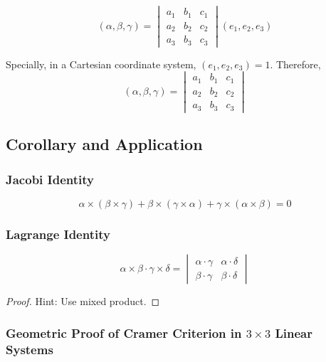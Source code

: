 \documentclass[onecolumn]{ctexart}
\begin{document}
\begin{equation}
  (\alpha, \beta, \gamma) = 
  \begin{vmatrix}
    a_1 & b_1 & c_1 \\
    a_2 & b_2 & c_2 \\
    a_3 & b_3 & c_3
  \end{vmatrix}
  (e_1, e_2, e_3)
\end{equation}

Specially, in a Cartesian coordinate system, $(e_1, e_2, e_3) = 1$. Therefore,
\begin{equation}
  (\alpha, \beta, \gamma) = 
  \begin{vmatrix}
    a_1 & b_1 & c_1 \\
    a_2 & b_2 & c_2 \\
    a_3 & b_3 & c_3
  \end{vmatrix}
\end{equation}

\subsection{Corollary and Application}

\subsubsection{Jacobi Identity}

\begin{equation}
  \alpha \times (\beta \times \gamma) + \beta \times (\gamma \times \alpha) + \gamma \times (\alpha \times \beta) = 0
\end{equation}

\subsubsection{Lagrange Identity}
\begin{equation}
  \alpha \times \beta \cdot \gamma \times \delta = 
  \begin{vmatrix}
    \alpha \cdot \gamma & \alpha \cdot \delta \\
    \beta \cdot \gamma & \beta \cdot \delta
  \end{vmatrix}
\end{equation}
\begin{proof}
  Hint: Use mixed product.
\end{proof}

\subsubsection{Geometric Proof of Cramer Criterion in $3 \times 3$ Linear Systems}
\end{document}
